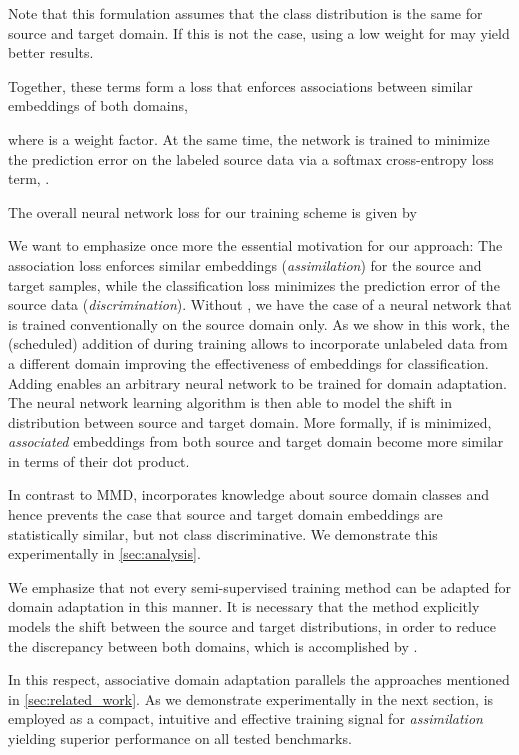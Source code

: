 \documentclass[10pt,twocolumn,letterpaper]{article}
\begin{document}
Note that this formulation assumes that the class distribution is the same for source and target domain. If this is not the case, using a low weight for  may yield better results.

Together, these terms form a loss that enforces associations between similar embeddings of both domains,  

where  is a weight factor.
At the same time, the network is trained to minimize the prediction error on the labeled source data via a softmax cross-entropy loss term, .

The overall neural network loss for our training scheme is given by


We want to emphasize once more the essential motivation for our approach: The association loss enforces similar embeddings (\emph{assimilation}) for the source and target samples, while the classification loss minimizes the prediction error of the source data (\emph{discrimination}).
Without , we have the case of a neural network that is trained conventionally \cite{Krizhevsky2012} on the source domain only. 
As we show in this work, the (scheduled) addition of  during training allows to incorporate unlabeled data from a different domain improving the effectiveness of embeddings for classification.
Adding  enables an arbitrary neural network to be trained for domain adaptation.
The neural network learning algorithm is then able to model the shift in distribution between source and target domain.
More formally, if  is minimized, \emph{associated} embeddings from both source and target domain become more similar in terms of their dot product. 

In contrast to MMD,  incorporates knowledge about source domain classes and hence prevents the case that source and target domain embeddings are statistically similar, but not class discriminative. We demonstrate this experimentally in \autoref{sec:analysis}.

We emphasize that not every semi-supervised training method can be adapted for domain adaptation in this manner. It is necessary that the method explicitly models the shift between the source and target distributions, in order to reduce the discrepancy between both domains, which is accomplished by .

In this respect, associative domain adaptation parallels the approaches mentioned in \autoref{sec:related_work}. As we demonstrate experimentally in the next section,  is employed as a compact, intuitive and effective training signal for \emph{assimilation} yielding superior performance on all tested benchmarks.
\end{document}
